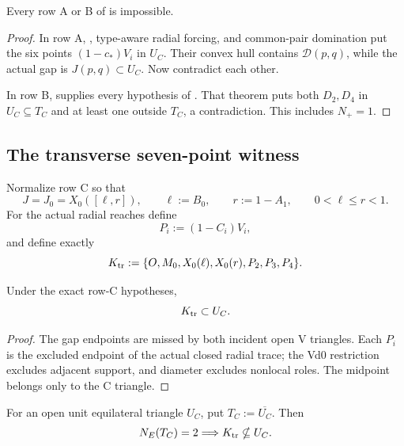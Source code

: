 
\FloatBarrier

\begin{proposition}
\label{prop:new-nplus-zero-gap-closures}
Every row A or B of  is impossible.
\end{proposition}

\begin{proof}
In row A, , type-aware radial
forcing, and common-pair domination put the six points
\((1-c_*)V_i\) in \(U_C\).  Their convex hull contains
\(\mathcal D(p,q)\), while the actual gap is \(J(p,q)\subset U_C\).
Now 
contradict each other.

In row B,  supplies every
hypothesis of .  That theorem puts both
\(D_2,D_4\) in \(U_C\subseteq T_C\) and at least one outside \(T_C\), a
contradiction.  This includes \(N_+=1\).
\end{proof}

\subsection{The transverse seven-point witness}

Normalize row C so that
\[
 J=J_0=X_0([\ell,r]),
 \qquad
 \ell:=B_0,
 \qquad
 r:=1-A_1,
 \qquad
 0<\ell\le r<1.
\]
For the actual radial reaches define
\[
 P_i:=(1-C_i)V_i,
\]
and define exactly
\[
 K_{\rm tr}:=
 \{O,M_0,X_0(\ell),X_0(r),P_2,P_3,P_4\}.
\]

\begin{lemma}
\label{lem:readable-k410-forced}
Under the exact row-C hypotheses,
\[
 K_{\rm tr}\subset U_C.
\]
\end{lemma}



\begin{proof}
The gap endpoints are missed by both incident open V triangles.  Each
\(P_i\) is the excluded endpoint of the actual closed radial trace; the Vd0
restriction excludes adjacent support, and diameter excludes nonlocal roles.
The midpoint belongs only to the C triangle.
\end{proof}

\begin{proposition}
\label{prop:readable-k410-ce2}
For an open unit equilateral triangle \(U_C\), put
\(T_C:=\overline{U_C}\).  Then
\[
 N_E(T_C)=2\Longrightarrow K_{\rm tr}\nsubseteq U_C.
\]
\end{proposition}

